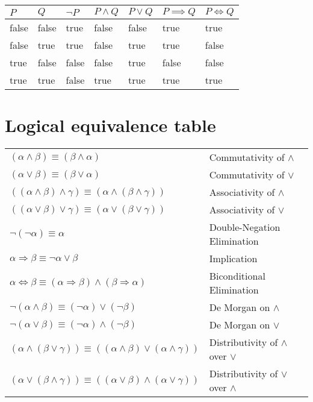 \documentclass{article}
\begin{document}
\begin{center}
    \begin{table}[h]
        \begin{tabular}{|l|l||l|l|l|l|l|}
        \hline
        $P$   & $Q$   & $\neg P$ & $P \land Q$ & $P \lor Q$ & $P \implies Q$ & $P \iff Q$ \\
        \hline
        \hline
        false & false & true    & false      & false      & true           & true       \\
        \hline
        false & true  & true    & false      & true       & true           & false      \\
        \hline
        true  & false & false   & false      & true       & false          & false      \\
        \hline
        true  & true  & false   & true       & true       & true           & true       \\
        \hline
        \end{tabular}
    \end{table}
\end{center}

\section*{Logical equivalence table}

\begin{center}
    \begin{tabular}{ll}
        $(\alpha \land \beta) \equiv (\beta \land \alpha)$ & Commutativity of $\land$ \\
        $(\alpha \lor \beta) \equiv (\beta \lor \alpha)$ & Commutativity of $\lor$ \\
        $((\alpha \land \beta) \land \gamma) \equiv (\alpha \land (\beta \land \gamma))$ & Associativity of $\land$ \\
        $((\alpha \lor \beta) \lor \gamma) \equiv (\alpha \lor (\beta \lor \gamma))$ & Associativity of $\lor$ \\
        $\neg (\neg \alpha) \equiv \alpha$ & Double-Negation Elimination \\
        $\alpha \Rightarrow \beta \equiv \neg \alpha \lor \beta$ & Implication \\
        $\alpha \Leftrightarrow \beta \equiv (\alpha \Rightarrow \beta) \land (\beta \Rightarrow \alpha)$ & Biconditional Elimination \\
        $\neg (\alpha \land \beta) \equiv (\neg \alpha) \lor (\neg \beta)$ & De Morgan on $\land$ \\
        $\neg (\alpha \lor \beta) \equiv (\neg \alpha) \land (\neg \beta)$ & De Morgan on $\lor$ \\
        $(\alpha \land (\beta \lor \gamma)) \equiv ((\alpha \land \beta) \lor (\alpha \land \gamma))$ & Distributivity of $\land$ over $\lor$ \\
        $(\alpha \lor (\beta \land \gamma)) \equiv ((\alpha \lor \beta) \land (\alpha \lor \gamma))$ & Distributivity of $\lor$ over $\land$ \\
    \end{tabular}
\end{center}
\end{document}
